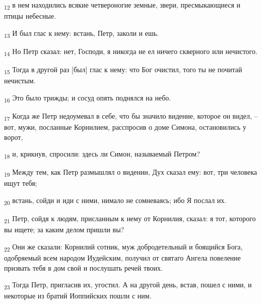 \begin{tcolorbox}
\textsubscript{12} в нем находились всякие четвероногие земные, звери, пресмыкающиеся и птицы небесные.
\end{tcolorbox}
\begin{tcolorbox}
\textsubscript{13} И был глас к нему: встань, Петр, заколи и ешь.
\end{tcolorbox}
\begin{tcolorbox}
\textsubscript{14} Но Петр сказал: нет, Господи, я никогда не ел ничего скверного или нечистого.
\end{tcolorbox}
\begin{tcolorbox}
\textsubscript{15} Тогда в другой раз [был] глас к нему: что Бог очистил, того ты не почитай нечистым.
\end{tcolorbox}
\begin{tcolorbox}
\textsubscript{16} Это было трижды; и сосуд опять поднялся на небо.
\end{tcolorbox}
\begin{tcolorbox}
\textsubscript{17} Когда же Петр недоумевал в себе, что бы значило видение, которое он видел, --вот, мужи, посланные Корнилием, расспросив о доме Симона, остановились у ворот,
\end{tcolorbox}
\begin{tcolorbox}
\textsubscript{18} и, крикнув, спросили: здесь ли Симон, называемый Петром?
\end{tcolorbox}
\begin{tcolorbox}
\textsubscript{19} Между тем, как Петр размышлял о видении, Дух сказал ему: вот, три человека ищут тебя;
\end{tcolorbox}
\begin{tcolorbox}
\textsubscript{20} встань, сойди и иди с ними, нимало не сомневаясь; ибо Я послал их.
\end{tcolorbox}
\begin{tcolorbox}
\textsubscript{21} Петр, сойдя к людям, присланным к нему от Корнилия, сказал: я тот, которого вы ищете; за каким делом пришли вы?
\end{tcolorbox}
\begin{tcolorbox}
\textsubscript{22} Они же сказали: Корнилий сотник, муж добродетельный и боящийся Бога, одобряемый всем народом Иудейским, получил от святаго Ангела повеление призвать тебя в дом свой и послушать речей твоих.
\end{tcolorbox}
\begin{tcolorbox}
\textsubscript{23} Тогда Петр, пригласив их, угостил. А на другой день, встав, пошел с ними, и некоторые из братий Иоппийских пошли с ним.
\end{tcolorbox}
